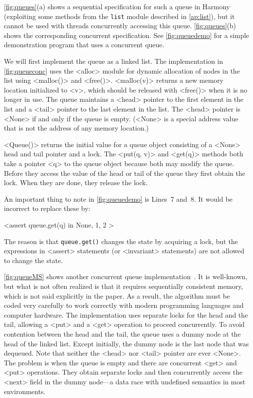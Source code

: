 \documentclass{report}
\newenvironment{code}{
\tcolorbox
}{
\endtcolorbox
}
\begin{document}
\noindent
\autoref{fig:queues}(a) shows a sequential specification for such a
queue in Harmony (exploiting some methods from the \texttt{list}
module described in \autoref{ap:list}),
but it cannot be used with threads concurrently accessing this queue.
\autoref{fig:queues}(b) shows the corresponding concurrent specification.
See \autoref{fig:queuedemo} for a simple demonstration program that uses
a concurrent queue.

We will first implement the queue as a linked list.
The implementation in \autoref{fig:queueconc}
uses the <{alloc}> module for dynamic allocation
%
of nodes in the list using <{malloc()}> and <{free()}>.
<{malloc(v)}> returns a new memory location initialized to <{v}>,
which should be released with <{free()}> when it is no longer in use.
The queue maintains a <{head}> pointer to the first element in the list
and a <{tail}> pointer to the last element in the list.
The <{head}> pointer is <{None}> if and only if the queue is empty.
(<{None}> is a special address value that is not the address of any
memory location.)

<{Queue()}> returns the initial value for a queue object
consisting of a <{None}> head and tail pointer and a lock.
The <{put(q, v)}> and <{get(q)}> methods both take a pointer <{q}> to the
queue object because both may modify the queue.
Before they access the value of the head or tail of the queue they first obtain
the lock.
When they are done, they release the lock.

An important thing to note in \autoref{fig:queuedemo}
is Lines~7 and~8.
It would be incorrect to replace these by:

\begin{code}
<{assert queue.get(q) in { None, 1, 2 }}>
\end{code}

The reason is that \texttt{queue.get()} changes the state by
acquiring a lock, but the expressions in <{assert}>
statements (or <{invariant}> statements)
are not allowed to change the state.

\autoref{fig:queueMS} shows another
concurrent queue implementation~\cite{MS96}.
It is well-known, but what is not often realized is that
it requires sequentially consistent memory, which is not
said explicitly in the paper.
As a result, the algorithm must be coded very carefully to work
correctly with modern programming languages and
computer hardware.
The implementation uses separate
locks for the head and the tail,
allowing a <{put}> and a <{get}> operation
to proceed concurrently.  To avoid contention between the head and the tail,
the queue uses a dummy node at the head of the linked list.
Except initially, the dummy node is the last node that was dequeued.
Note that neither the <{head}> nor <{tail}> pointer are
ever <{None}>.
The problem is when the queue is empty and there are concurrent
<{get}> and <{put}> operations.
They obtain separate locks and then concurrently access the
<{next}> field in the dummy node---a data race with
undefined semantics in most environments.
\end{document}
